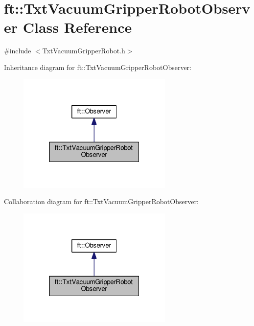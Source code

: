 \hypertarget{classft_1_1_txt_vacuum_gripper_robot_observer}{}\section{ft\+:\+:Txt\+Vacuum\+Gripper\+Robot\+Observer Class Reference}
\label{classft_1_1_txt_vacuum_gripper_robot_observer}


{\ttfamily \#include $<$Txt\+Vacuum\+Gripper\+Robot.\+h$>$}



Inheritance diagram for ft\+:\+:Txt\+Vacuum\+Gripper\+Robot\+Observer\+:
\nopagebreak
\begin{figure}[H]
\begin{center}
\leavevmode
\includegraphics[width=217pt]{classft_1_1_txt_vacuum_gripper_robot_observer__inherit__graph}
\end{center}
\end{figure}


Collaboration diagram for ft\+:\+:Txt\+Vacuum\+Gripper\+Robot\+Observer\+:
\nopagebreak
\begin{figure}[H]
\begin{center}
\leavevmode
\includegraphics[width=217pt]{classft_1_1_txt_vacuum_gripper_robot_observer__coll__graph}
\end{center}
\end{figure}
